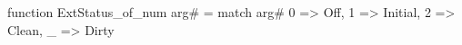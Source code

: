 function ExtStatus_of_num arg# = match arg# {
  0 => Off,
  1 => Initial,
  2 => Clean,
  _ => Dirty
}
